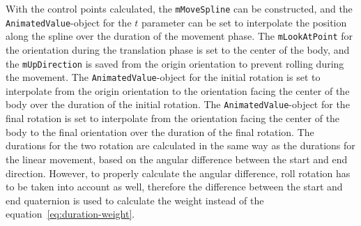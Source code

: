 With the control points calculated, the \texttt{mMoveSpline} can be constructed, and the
\texttt{AnimatedValue}-object for the $t$ parameter can be set to interpolate the position along the spline
over the duration of the movement phase.
The \texttt{mLookAtPoint} for the orientation during the translation phase is set to the center of the body,
and the \texttt{mUpDirection} is saved from the origin orientation to prevent rolling during the movement.
The \texttt{AnimatedValue}-object for the initial rotation is set to interpolate from the origin orientation
to the orientation facing the center of the body over the duration of the initial rotation.
The \texttt{AnimatedValue}-object for the final rotation is set to interpolate from the orientation facing the
center of the body to the final orientation over the duration of the final rotation.
The durations for the two rotation are calculated in the same way as the durations for the linear movement, based on
the angular difference between the start and end direction.
However, to properly calculate the angular difference, roll rotation has to be taken into account as well, therefore
the difference between the start and end quaternion is used to calculate the weight instead of the
equation~\ref{eq:duration-weight}.
